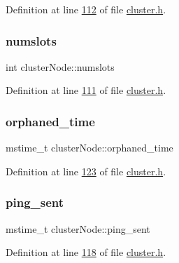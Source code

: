 Definition at line \hyperlink{cluster_8h_source_l00112}{112} of file \hyperlink{cluster_8h_source}{cluster.\+h}.

\mbox{\label{structclusterNode_a369c3823027d5aef6928189b480f52ee}} 
\subsubsection{\texorpdfstring{numslots}{numslots}}
{\footnotesize\ttfamily int cluster\+Node\+::numslots}



Definition at line \hyperlink{cluster_8h_source_l00111}{111} of file \hyperlink{cluster_8h_source}{cluster.\+h}.

\mbox{\label{structclusterNode_a70a653ebe05b396d234db25b51bffeb6}} 
\subsubsection{\texorpdfstring{orphaned\+\_\+time}{orphaned\_time}}
{\footnotesize\ttfamily mstime\+\_\+t cluster\+Node\+::orphaned\+\_\+time}



Definition at line \hyperlink{cluster_8h_source_l00123}{123} of file \hyperlink{cluster_8h_source}{cluster.\+h}.

\mbox{\label{structclusterNode_ab3eb79015f20bf51dc971da964133f0b}} 
\subsubsection{\texorpdfstring{ping\+\_\+sent}{ping\_sent}}
{\footnotesize\ttfamily mstime\+\_\+t cluster\+Node\+::ping\+\_\+sent}



Definition at line \hyperlink{cluster_8h_source_l00118}{118} of file \hyperlink{cluster_8h_source}{cluster.\+h}.

\mbox{\label{structclusterNode_a58e3914e6485d5fcba3b14d28ef053e8}} 
